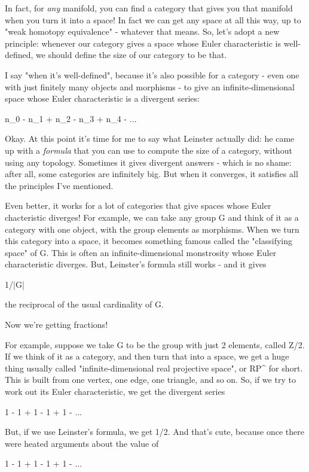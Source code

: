In fact, for \emph{any} manifold, you can find a category that gives
you that manifold when you turn it into a space!  In fact we can get
any space at all this way, up to "weak homotopy equivalence" -
whatever that means.  So, let's adopt a new principle: whenever our
category gives a space whose Euler characteristic is well-defined, we
should define the size of our category to be that.

I say "when it's well-defined", because it's also possible
for a category - even one with just finitely many objects and
morphisms - to give an infinite-dimensional space whose Euler
characteristic is a divergent series:

n_{0} - n_{1} + n_{2} - n_{3} +
n_{4} - ...

Okay.  At this point it's time for me to say what Leinster actually
did: he came up with a \emph{formula} that you can use to compute
the size of a category, without using any topology.  Sometimes it
gives divergent answers - which is no shame: after all, some
categories are infinitely big.  But when it converges, it satisfies
all the principles I've mentioned.

Even better, it works for a lot of categories that give spaces whose
Euler chacteristic diverges!  For example, we can take any group G and
think of it as a category with one object, with the group elements as
morphisms.  When we turn this category into a space, it becomes
something famous called the "classifying space" of G.  This
is often an infinite-dimensional monstrosity whose Euler
characteristic diverges.  But, Leinster's formula still works - and it
gives

1/|G|

the reciprocal of the usual cardinality of G.  

Now we're getting fractions!  

For example, suppose we take G to be the group with just 2 elements,
called Z/2.  If we think of it as a category, and then turn that into
a space, we get a huge thing usually called "infinite-dimensional
real projective space", or RP^{\infty } for short.  This
is built from one vertex, one edge, one triangle, and so on.  So, if
we try to work out its Euler characteristic, we get the divergent
series

1 - 1 + 1 - 1 + 1 - ...

But, if we use Leinster's formula, we get 1/2.  And that's cute, because 
once there were heated arguments about the value of 

1 - 1 + 1 - 1 + 1 - ...

